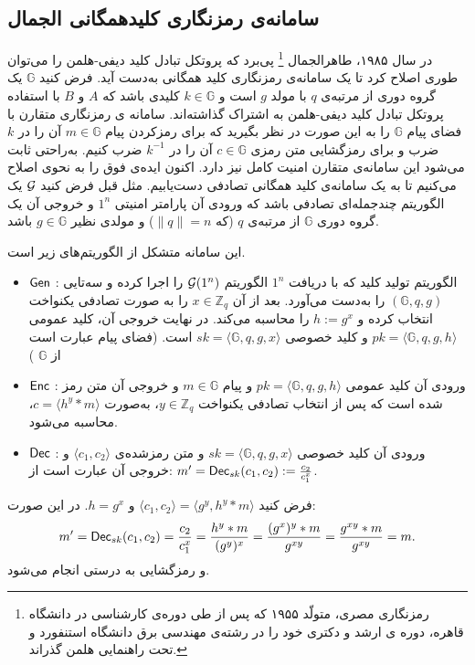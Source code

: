 \subsection*{سامانه‌ی رمزنگاری کلیدهمگانی الجمال}
در سال ۱۹۸۵، طاهرالجمال
\footnote{رمزنگاری مصری، متولّد ۱۹۵۵ که پس از طی دوره‌ی کارشناسی در دانشگاه قاهره، دوره ی ارشد و دکتری خود را در رشته‌ی مهندسی برق  دانشگاه استنفورد و تحت راهنمایی هلمن گذراند. }
پی‌برد که پروتکل تبادل کلید دیفی-هلمن را می‌توان طوری اصلاح کرد تا  یک سامانه‌ی رمزنگاری کلید همگانی به‌دست  آید. فرض کنید 
$\mathbb{G}$
یک گروه دوری از مرتبه‌ی 
$q$
با مولد 
$g$
است و 
$k\in\mathbb{G}$
 کلیدی باشد که 
$A$
و 
$B$
با استفاده پروتکل تبادل کلید دیفی-هلمن به اشتراک گذاشته‌اند.  سامانه ی رمزنگاری متقارن با فضای پیام 
$\mathbb{G}$
را به این صورت در نظر بگیرید که برای رمزکردن پیام 
$m\in\mathbb{G}$
آن را در 
$k$
ضرب و برای رمزگشایی متن رمزی 
$c\in\mathbb{G}$
آن را در 
$k^{-1}$
ضرب کنیم. به‌راحتی ثابت می‌شود این سامانه‌ی متقارن امنیت کامل نیز دارد. اکنون ایده‌ی فوق را به نحوی اصلاح می‌کنیم تا به یک سامانه‌ی کلید همگانی تصادفی دست‌یابیم. مثل قبل فرض کنید 
${\mathcal G}$
 یک الگوریتم چندجمله‌ای تصادفی باشد که ورودی آن پارامتر امنیتی 
 $1^{n}$
 و خروجی آن یک گروه دوری 
 $\mathbb{G}$
 از مرتبه‌ی 
 $q$
 (که 
 $\parallel q\parallel = n$)
 و مولدی نظیر 
 $g\in\mathbb{G}$
 باشد. 
\begin{definition}
این سامانه متشکل از الگوریتم‌های زیر است.
\begin{itemize}
\item
$\mathsf{Gen}$
: الگوریتم تولید کلید که با دریافت 
$1^{n}$
 الگوریتم 
 ${\mathcal G}(1^{n})$
 را اجرا کرده و سه‌تایی
 $(\mathbb{G}, q, g)$
 را به‌دست  می‌آورد. بعد از آن
 $x\in\mathbb{Z}_{q}$
 را به صورت تصادفی یکنواخت انتخاب کرده و 
 $h:=g^{x}$
 را محاسبه می‌کند. در نهایت خروجی آن، کلید عمومی 
 $pk = \langle \mathbb{G}, q, g, h\rangle$
 و کلید خصوصی 
 $sk = \langle \mathbb{G}, q, g, x\rangle$
 است. (فضای پیام عبارت است از 
 $\mathbb{G}$
 )
 \item
 $\mathsf{Enc}$
 : ورودی آن کلید عمومی 
 $pk = \langle \mathbb{G}, q, g, h\rangle$
 و پیام 
 $m\in\mathbb{G}$
 و خروجی آن متن رمز شده است که پس از انتخاب تصادفی یکنواخت 
 $y\in\mathbb{Z}_{q}$،
  به‌صورت 
 $c = \langle h^{y}*m\rangle$، 
   محاسبه می‌شود.
 \item
 $\mathsf{Dec}$
 : ورودی آن کلید خصوصی 
 $sk = \langle \mathbb{G}, q, g, x\rangle$
 و متن رمزشده‌ی 
 $\langle c_{1}, c_{2}\rangle$
 و خروجی آن عبارت است از:
 $m' = \mathsf{Dec}_{sk}(c_{1}, c_{2}):=\frac{c_{2}}{c_{1}^{x}}$.
\end{itemize}
\end{definition}
فرض کنید 
$\langle c_{1}, c_{2}\rangle = \langle g^{y}, h^{y}*m\rangle$
و
$h = g^{x}$.
در این صورت:
$$m' = \mathsf{Dec}_{sk}(c_{1}, c_{2}) = \frac{c_{2}}{c_{1}^{x}} =  \frac{h^{y}*m}{(g^{y})^{x}} = \frac{(g^{x})^{y}*m}{g^{xy}} = \frac{g^{xy}*m}{g^{xy}} = m.$$
و رمزگشایی به درستی انجام می‌شود.

